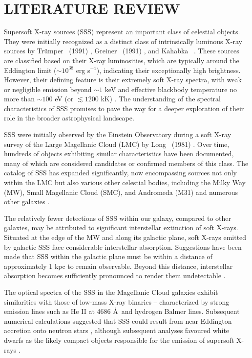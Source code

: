     \newpage
    \section{\MakeUppercase{Literature Review}} \label{multi-obs:lit-rev}
    	Supersoft X-ray sources (SSS) represent an important class of celestial objects. They were initially recognized as a distinct class of intrinsically luminous X-ray sources by Trümper \etal\ (1991) \cite{trumper1991x}, Greiner \etal\ (1991) \cite{greiner1991rosat}, and Kahabka \etal\ \cite{kahabka97}. These sources are classified based on their X-ray luminosities, which are typically around the Eddington limit ($\sim 10^{38}$ erg s$^{-1}$), indicating their exceptionally high brightness. However, their defining feature is their extremely soft X-ray spectra, with weak or negligible emission beyond $\sim 1$ keV and effective blackbody temperature no more than $\sim 100$ eV (or $\lesssim 1200$ kK) \cite{kahabka06}. The understanding of the spectral characteristics of SSS promises to pave the way for a deeper exploration of their role in the broader astrophysical landscape.
    	
    	SSS were initially observed by the Einstein Observatory during a soft X-ray survey of the Large Magellanic Cloud (LMC) by Long \etal\ (1981) \cite{long81}. Over time, hundreds of objects exhibiting similar characteristics have been documented, many of which are considered candidates or confirmed members of this class. The catalog of SSS has expanded significantly, now encompassing sources not only within the LMC but also various other celestial bodies, including the Milky Way (MW), Small Magellanic Cloud (SMC), and Andromeda (M31) and numerous other galaxies \cite{kahabkatrumper1996,steinerdiaz1998,greiner2000,pietsch2003deep,di2003luminous,orio2010census,henze2010recent,sturm2012new,galiullin2021populations}.
    	
    	The relatively fewer detections of SSS within our galaxy, compared to other galaxies, may be attributed to significant interstellar extinction of soft X-rays. Situated at the edge of the MW and along its galactic plane, soft X-rays emitted by galactic SSS face considerable interstellar absorption. Suggestions have been made that SSS within the galactic plane must be within a distance of approximately 1 kpc to remain observable. Beyond this distance, interstellar absorption becomes sufficiently pronounced to render them undetectable \cite{van1992accreting}.
    	
    	The optical spectra of the SSS in the Magellanic Cloud galaxies exhibit similarities with those of low-mass X-ray binaries -- characterized by strong emission lines such as He II at 4686 \AA\ and hydrogen Balmer lines. Subsequent numerical calculations suggested that SSS could result from near-Eddington accretion onto neutron stars \cite{kylafis93}, although subsequent analyses favoured white dwarfs as the likely compact objects responsible for the emission of supersoft X-rays \cite{van1992accreting}.
    	
